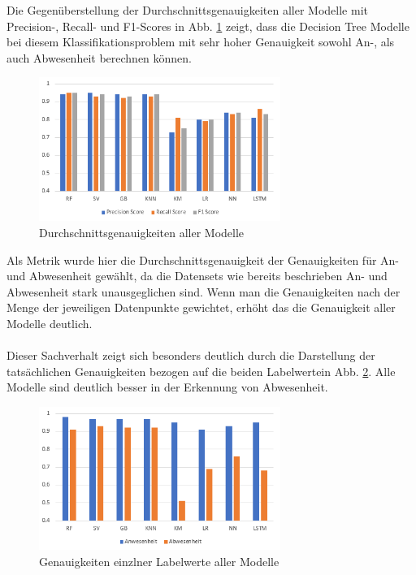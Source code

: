 \newpage

Die Gegenüberstellung der Durchschnittsgenauigkeiten aller Modelle mit Precision-, Recall- und F1-Scores in 
Abb. \ref{fig:ResAll}  zeigt, dass die Decision Tree Modelle bei diesem Klassifikationsproblem mit sehr hoher
Genauigkeit sowohl An-, als auch Abwesenheit berechnen können.
\begin{figure}[h]
    \centering
    \includegraphics[width=0.7\textwidth]{pic/results_all.png}
    \caption{Durchschnittsgenauigkeiten aller Modelle}
    \label{fig:ResAll}
\end{figure}

Als Metrik wurde hier die Durchschnittsgenauigkeit der Genauigkeiten für An- und Abwesenheit gewählt, da die 
Datensets wie bereits beschrieben An- und Abwesenheit stark unausgeglichen sind. Wenn man die Genauigkeiten
nach der Menge der jeweiligen Datenpunkte gewichtet, erhöht das die Genauigkeit aller Modelle deutlich.\\\\ 

Dieser Sachverhalt zeigt sich besonders deutlich durch die Darstellung der tatsächlichen Genauigkeiten bezogen 
auf die beiden Labelwertein Abb. \ref{fig:ResSpec}. Alle Modelle sind deutlich besser in der Erkennung von 
Abwesenheit.

\begin{figure}[h]
    \centering
    \includegraphics[width=0.7\textwidth]{pic/results_spec.png}
    \caption{Genauigkeiten einzlner Labelwerte aller Modelle}
    \label{fig:ResSpec}
\end{figure}

